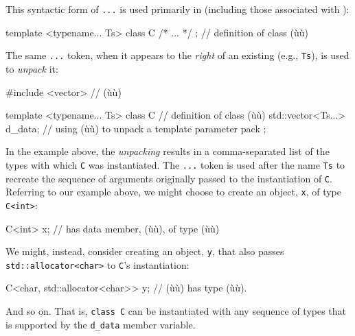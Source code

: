 This syntactic form of \lstinline!...! is used primarily in
 (including those associated with
):

\begin{emcppslisting}
template <typename... Ts>
class C { /* ... */ };  // definition of class (ù{}ù)
\end{emcppslisting}
    

\noindent The same \lstinline!...! token, when it appears to the \emph{right} of an
existing  (e.g., \lstinline!Ts!), is used
to \emph{unpack} it:

\begin{emcppslisting}
#include <vector>  // (ù{}ù)

template <typename... Ts> class C  // definition of class (ù{}ù)
{
    std::vector<Ts...> d_data;
        // using (ù{}ù) to unpack a template parameter pack
};
\end{emcppslisting}
    

\noindent In the example above, the \emph{unpacking} results in a comma-separated
list of the types with which \lstinline!C! was instantiated. The
\lstinline!...! token is used after the 
name \lstinline!Ts! to recreate the sequence of arguments originally passed
to the instantiation of \lstinline!C!. Referring to our example above, we
might choose to create an object, \lstinline!x!, of type \lstinline!C<int>!:

\begin{emcppslisting}
C<int> x;  // has data member, (ù{}ù), of type (ù{}ù)
\end{emcppslisting}
    

\noindent We might, instead, consider creating an object, \lstinline!y!, that also
passes \lstinline!std::allocator<char>! to \lstinline!C!'s instantiation:

\begin{emcppslisting}
C<char, std::allocator<char>> y;
    // (ù{}ù) has type (ù{}ù).
\end{emcppslisting}
    

\noindent And so on. That is, \lstinline!class!~\lstinline!C! can be instantiated with
any sequence of types that is supported by the \lstinline!d_data! member
variable.

